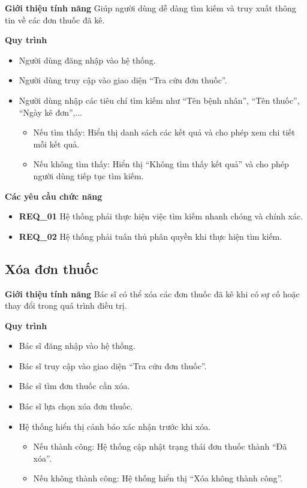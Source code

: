 \noindent \textbf{Giới thiệu tính năng}
Giúp người dùng dễ dàng tìm kiếm và truy xuất thông tin về các đơn thuốc đã kê.

\noindent \textbf{Quy trình}
\begin{itemize}
    \item Người dùng đăng nhập vào hệ thống.
    \item Người dùng truy cập vào giao diện ``Tra cứu đơn thuốc''.
    \item Người dùng nhập các tiêu chí tìm kiếm như ``Tên bệnh nhân'', ``Tên thuốc'', ``Ngày kê đơn'',...
    \begin{itemize}
        \item Nếu tìm thấy: Hiển thị danh sách các kết quả và cho phép xem chi tiết mỗi kết quả.
        \item Nếu không tìm thấy: Hiển thị ``Không tìm thấy kết quả'' và cho phép người dùng tiếp tục tìm kiếm.
    \end{itemize}
\end{itemize}

\noindent \textbf{Các yêu cầu chức năng}
\begin{itemize}
    \item \textbf{REQ\_01} Hệ thống phải thực hiện việc tìm kiếm nhanh chóng và chính xác.
    \item \textbf{REQ\_02} Hệ thống phải tuân thủ phân quyền khi thực hiện tìm kiếm.
\end{itemize}

\subsection{Xóa đơn thuốc}

\noindent \textbf{Giới thiệu tính năng}
Bác sĩ có thể xóa các đơn thuốc đã kê khi có sự cố hoặc thay đổi trong quá trình điều trị.

\noindent \textbf{Quy trình}
\begin{itemize}
    \item Bác sĩ đăng nhập vào hệ thống.
    \item Bác sĩ truy cập vào giao diện ``Tra cứu đơn thuốc''.
    \item Bác sĩ tìm đơn thuốc cần xóa.
    \item Bác sĩ lựa chọn xóa đơn thuốc.
    \item Hệ thống hiển thị cảnh báo xác nhận trước khi xóa.
    \begin{itemize}
        \item Nếu thành công: Hệ thống cập nhật trạng thái đơn thuốc thành ``Đã xóa''.
        \item Nếu không thành công: Hệ thống hiển thị ``Xóa không thành công''.
    \end{itemize}
\end{itemize}

